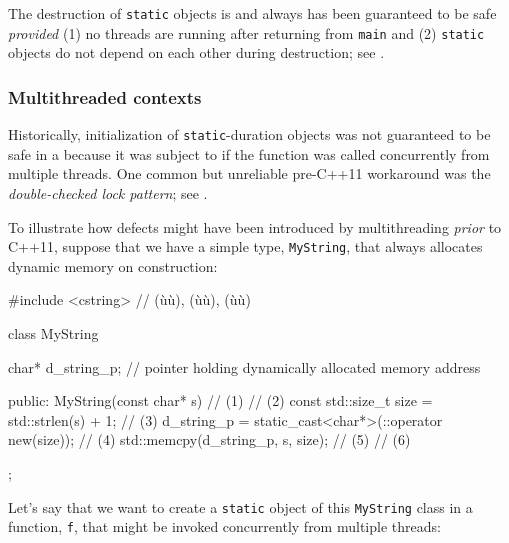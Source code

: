 The destruction of  \lstinline!static! objects is
and always has been guaranteed to be safe \emph{provided} (1) no threads
are running after returning from \lstinline!main! and (2)
 \lstinline!static! objects do not depend on each
other during destruction; see .

\subsubsection[Multithreaded contexts]{Multithreaded contexts}\label{multithreaded-contexts}

Historically, initialization of 
\lstinline!static!-duration objects was not guaranteed to be safe in a
 because it was subject to  if the function was called concurrently from multiple threads.
One common but unreliable pre-C++11 workaround was the
\emph{double-checked lock pattern}; see .

To illustrate how defects might have been introduced by multithreading
\emph{prior} to C++11, suppose that we have a simple type,
\lstinline!MyString!, that always allocates dynamic memory on construction:

\begin{emcppslisting}[emcppsbatch=e4]
#include <cstring>  // (ù{}ù), (ù{}ù), (ù{}ù)

class MyString
{
    char* d_string_p;  // pointer holding dynamically allocated memory address

public:
    MyString(const char* s)                                     // (1)
    {                                                           // (2)
        const std::size_t size = std::strlen(s) + 1;            // (3)
        d_string_p = static_cast<char*>(::operator new(size));  // (4)
        std::memcpy(d_string_p, s, size);                       // (5)
    }                                                           // (6)
};
\end{emcppslisting}

\noindent Let's say that we want to create a \lstinline!static! object of this
\lstinline!MyString! class in a function, \lstinline!f!, that might be invoked
concurrently from multiple threads:


